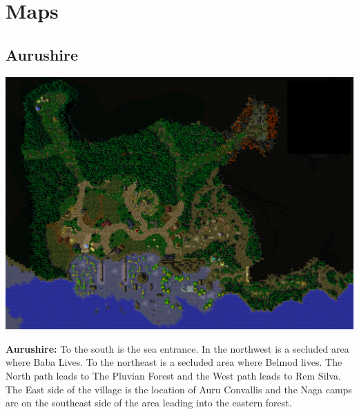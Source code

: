 \onecolumn
\chapter{Maps}
\section{Aurushire}
\begin{center}
	\includegraphics[width=\linewidth]{img/Aurushire.png}
	
	{\textbf{Aurushire:} To the south is the sea entrance. In the northwest is a secluded area where Baba Lives. To the northeast is a secluded area where Belmod lives. The North path leads to The Pluvian Forest and the West path leads to Rem Silva. The East side of the village is the location of Auru Convallis and the Naga camps are on the southeast side of the area leading into the eastern forest.}
\end{center}

